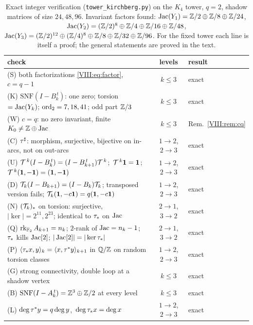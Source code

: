 \begin{table}[ht]
\centering\footnotesize
\renewcommand{\arraystretch}{1.2}
\begin{tabular}{p{10.6cm}cl}
\toprule
check & levels & result\\
\midrule
(S) both factorizations \eqref{VIII:eq:factor}, $c=q-1$ & $k\le3$ & exact\\
(K) $\mathrm{SNF}(I-B_k^{\,t})$: one zero; torsion $=\operatorname{Jac}(Y_k)$; $\operatorname{ord}_2=7,18,41$; odd part $\mathbb{Z}/3$ & $k\le3$ & exact\\
(W) $c=q$: no zero invariant, finite $K_0\ne\mathbb{Z}\oplus\operatorname{Jac}$ & $k\le3$ & Rem.~\ref{VIII:rem:cq}\\
(C) ${\tau}^{\sharp}$: morphism, surjective, bijective on in-arcs, not on out-arcs & $1\to2$, $2\to3$ & exact\\
(U) $\mathcal{T}^{\,k}(I-B_k^{\,t})=(I-B_{k+1}^{\,t})\mathcal{T}^{\,k}$;\ $\mathcal{T}^{\,k}\mathbf1=\mathbf1$;\ $\mathcal{T}^{\,k}(\mathbf1,-\mathbf1)=(\mathbf1,-\mathbf1)$ & $1\to2$, $2\to3$ & exact\\
(D) $\mathcal{T}_{k}(I-B_{k+1})=(I-B_k)\mathcal{T}_{k}$; transposed version fails; $\mathcal{T}_{k}(\mathbf1,-c\mathbf1)=q(\mathbf1,-c\mathbf1)$ & $1\to2$, $2\to3$ & exact\\
(N) $(\mathcal{T}_{k})_*$ on torsion: surjective, $|\ker|=2^{11},2^{23}$; identical to $\tau_*$ on $\operatorname{Jac}$ & $2\to1$, $3\to2$ & exact\\
(Q) $\operatorname{rk}_{\mathbb{F}_2}A_{k+1}=n_k$; $2$-rank of $\operatorname{Jac}=n_k-1$; $\tau_*$ kills $\operatorname{Jac}[2]$; $|\operatorname{Jac}[2]|=|\ker\tau_*|$ & $2\to1$, $3\to2$ & exact\\
(P) $\langle\tau_* x,y\rangle_k=\langle x,\tau^* y\rangle_{k+1}$ in $\mathbb{Q}/\mathbb{Z}$ on random torsion classes & $1\to2$, $2\to3$ & exact\\
(G) strong connectivity, double loop at a shadow vertex & $k\le3$ & exact\\
(B) $\mathrm{SNF}(I-A_k^{\,t})=\mathbb{Z}^3\oplus\mathbb{Z}/2$ at every level & $k\le3$ & exact\\
(L) $\deg\tau^* y=q\deg y$,\ $\deg\tau_* x=\deg x$ & $1\to2$, $2\to3$ & exact\\
\bottomrule
\end{tabular}
\medskip
\caption{Exact integer verification (\texttt{tower\_kirchberg.py}) on the $K_4$ tower,
$q=2$, shadow matrices of size $24,48,96$. Invariant factors found:
$\operatorname{Jac}(Y_1)=\mathbb{Z}/2\oplus\mathbb{Z}/8\oplus\mathbb{Z}/24$, $\operatorname{Jac}(Y_2)=(\mathbb{Z}/2)^8\oplus\mathbb{Z}/4\oplus\mathbb{Z}/16\oplus\mathbb{Z}/48$,
$\operatorname{Jac}(Y_3)=(\mathbb{Z}/2)^{12}\oplus(\mathbb{Z}/4)^8\oplus\mathbb{Z}/8\oplus\mathbb{Z}/32\oplus\mathbb{Z}/96$. For the fixed tower
each line is itself a proof; the general statements are proved in the text.}
\label{VIII:tab:battery}
\end{table}

